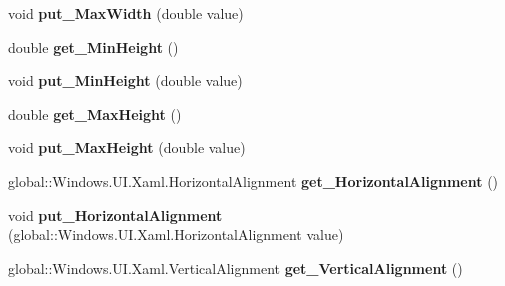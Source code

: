 \begin{DoxyCompactItemize}
void {\bfseries put\+\_\+\+Max\+Width} (double value)
\item 
\mbox{\label{interface_windows_1_1_u_i_1_1_xaml_1_1_i_framework_element_a5eb796332425e5720055d42398ac4a38}} 
double {\bfseries get\+\_\+\+Min\+Height} ()
\item 
\mbox{\label{interface_windows_1_1_u_i_1_1_xaml_1_1_i_framework_element_a40a39aa19edb81ecda1099fb601ca3b4}} 
void {\bfseries put\+\_\+\+Min\+Height} (double value)
\item 
\mbox{\label{interface_windows_1_1_u_i_1_1_xaml_1_1_i_framework_element_a7fd2781c3f760e605441d9dda430e90d}} 
double {\bfseries get\+\_\+\+Max\+Height} ()
\item 
\mbox{\label{interface_windows_1_1_u_i_1_1_xaml_1_1_i_framework_element_aea77c6cfc78af44390a3dfc2768ab96b}} 
void {\bfseries put\+\_\+\+Max\+Height} (double value)
\item 
\mbox{\label{interface_windows_1_1_u_i_1_1_xaml_1_1_i_framework_element_a60effb1f7f1912daafa8558633745836}} 
global\+::\+Windows.\+U\+I.\+Xaml.\+Horizontal\+Alignment {\bfseries get\+\_\+\+Horizontal\+Alignment} ()
\item 
\mbox{\label{interface_windows_1_1_u_i_1_1_xaml_1_1_i_framework_element_a94803d051b65803464005eaca8d55c70}} 
void {\bfseries put\+\_\+\+Horizontal\+Alignment} (global\+::\+Windows.\+U\+I.\+Xaml.\+Horizontal\+Alignment value)
\item 
\mbox{\label{interface_windows_1_1_u_i_1_1_xaml_1_1_i_framework_element_a5c99e9c5ee87e9df550209699e7666f7}} 
global\+::\+Windows.\+U\+I.\+Xaml.\+Vertical\+Alignment {\bfseries get\+\_\+\+Vertical\+Alignment} ()
\item 
\mbox{\label{interface_windows_1_1_u_i_1_1_xaml_1_1_i_framework_element_aad18ff5b25e09bbbcc7f6a3b5519e4ab}} 

\end{DoxyCompactItemize}
